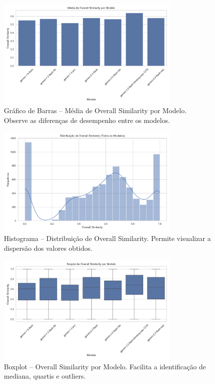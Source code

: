 \documentclass{article}%
\begin{document}
\begin{figure}[H]%
\centering%
\includegraphics[width=0.8\textwidth]{analysis_results/barplot_overall_similarity.png}%
\caption{Gráfico de Barras – Média de Overall Similarity por Modelo. Observe as diferenças de desempenho entre os modelos.}%
\end{figure}

%


\begin{figure}[H]%
\centering%
\includegraphics[width=0.8\textwidth]{analysis_results/histogram_overall_similarity.png}%
\caption{Histograma – Distribuição de Overall Similarity. Permite visualizar a dispersão dos valores obtidos.}%
\end{figure}

%


\begin{figure}[H]%
\centering%
\includegraphics[width=0.8\textwidth]{analysis_results/boxplot_overall_similarity.png}%
\caption{Boxplot – Overall Similarity por Modelo. Facilita a identificação de mediana, quartis e outliers.}%
\end{figure}
\end{document}
